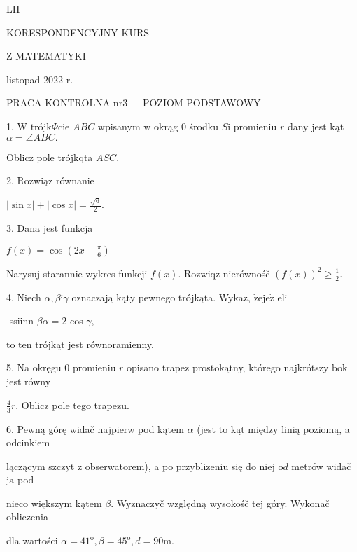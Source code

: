 \documentclass[a4paper,12pt]{article}
\begin{document}
LII

KORESPONDENCYJNY KURS

Z MATEMATYKI

listopad 2022 r.

PRACA KONTROLNA $\mathrm{n}\mathrm{r} 3-$ POZIOM PODSTAWOWY

1. $\mathrm{W}$ trójk$\Phi$cie $ABC$ wpisanym $\mathrm{w}$ okrąg $0$ środku $S\mathrm{i}$ promieniu $r$ dany jest kąt $\alpha=\angle ABC.$

Oblicz pole trójkqta $ASC.$

2. Rozwiąz równanie

$|\displaystyle \sin x|+|\cos x|=\frac{\sqrt{6}}{2}.$

3. Dana jest funkcja

$f(x)=\displaystyle \cos(2x-\frac{\pi}{6})$

Narysuj starannie wykres funkcji $f(x)$. Rozwiqz nierównośč $(f(x))^{2}\displaystyle \geq\frac{1}{2}.$

4. Niech $\alpha, \beta \mathrm{i}\gamma$ oznaczają kąty pewnego trójkąta. Wykaz, $\dot{\mathrm{z}}\mathrm{e}\mathrm{j}\mathrm{e}\dot{\mathrm{z}}$ eli

-ssiinn $\beta\alpha =$2 cos $\gamma$,

to ten trójkąt jest równoramienny.

5. Na okręgu $0$ promieniu $r$ opisano trapez prostokątny, którego najkrótszy bok jest równy

$\displaystyle \frac{4}{3}r$. Oblicz pole tego trapezu.

6. Pewną górę widač najpierw pod kątem $\alpha$ (jest to kąt między linią poziomą, a odcinkiem

lączącym szczyt $\mathrm{z}$ obserwatorem), a po przyblizeniu się do niej $\mathrm{o}d$ metrów widač $\mathrm{j}\mathrm{a}$ pod

nieco większym kątem $\beta$. Wyznaczyč względną wysokośč tej góry. Wykonač obliczenia

dla wartości $\alpha=41^{\mathrm{o}}, \beta=45^{\mathrm{o}}, d=90\mathrm{m}.$
\end{document}
